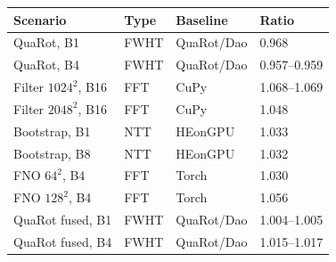 \begin{tabular}{@{}llll@{}}
\toprule
Scenario & Type & Baseline & Ratio\\\midrule
QuaRot, B1 & FWHT & QuaRot/Dao & 0.968\\
QuaRot, B4 & FWHT & QuaRot/Dao & 0.957--0.959\\
Filter $1024^2$, B16 & FFT & CuPy & 1.068--1.069\\
Filter $2048^2$, B16 & FFT & CuPy & 1.048\\
Bootstrap, B1 & NTT & HEonGPU & 1.033\\
Bootstrap, B8 & NTT & HEonGPU & 1.032\\
FNO $64^2$, B4 & FFT & Torch & 1.030\\
FNO $128^2$, B4 & FFT & Torch & 1.056\\
\midrule
QuaRot fused, B1 & FWHT & QuaRot/Dao & 1.004--1.005\\
QuaRot fused, B4 & FWHT & QuaRot/Dao & 1.015--1.017\\
\bottomrule
\end{tabular}

